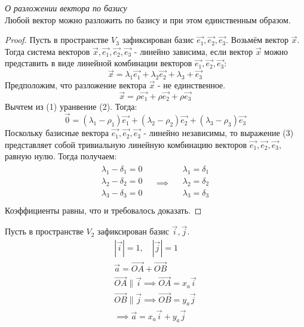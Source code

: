 \begin{theorem}
  \textit{О разложении вектора по базису} \\
  Любой вектор можно разложить по базису и при этом единственным образом.
\end{theorem}
\begin{proof}
  Пусть в пространстве $V_3$ зафиксирован базис $\vec{e_1}, \vec{e_2}, \vec{e_3}$. Возьмём вектор $\vec{x}$. Тогда система векторов $\vec{x}, \vec{e_1}, \vec{e_2}, \vec{e_3}$ - линейно зависима, если вектор $\vec{x}$ можно представить в виде линейной комбинации векторов $\vec{e_1}, \vec{e_2}, \vec{e_3}$: \[
  \vec{x} = \lambda_1 \vec{e_1} + \lambda_2 \vec{e_2} + \lambda_3 + \vec{e_3} \tag{1}
\]
  Предположим, что разложение вектора $\vec{x}$ - не единственное. \[
  \vec{x} = \rho \vec{e_1} + \rho \vec{e_2} + \rho \vec{e_3} \tag{2}
\]
  Вычтем из (1) уранвение (2). Тогда: \[
    \vec{0} = \left( \lambda_1 - \rho_1 \right) \vec{e_1} + \left( \lambda_2 - \rho_2 \right) \vec{e_2} + \left( \lambda_3 - \rho_3 \right) \vec{e_3} \tag{3}
\]
Поскольку базисные вектора $\vec{e_1}, \vec{e_2}, \vec{e_3}$ - линейно независимы, то выражение (3) представляет собой тривиальную линейную комбинацию векторов $\vec{e_1}, \vec{e_2}, \vec{e_3}$, равную нулю. Тогда получаем:
  \begin{gather*}
    \begin{matrix}  
      \lambda_1 - \delta_1 = 0 \\
      \lambda_2 - \delta_2 = 0 \\
      \lambda_3 - \delta_3 = 0 \\
    \end{matrix}
    \quad \implies \quad
    \begin{matrix}
      \lambda_1 = \delta_1 \\
      \lambda_2 = \delta_2 \\
      \lambda_3 = \delta_3 \\
    \end{matrix}
  \end{gather*}
  Коэффициенты равны, что и требовалось доказать.
\end{proof}
\begin{eg}
  Пусть в пространстве $V_2$ зафиксирован базис $\vec{i}, \vec{j}$.
  \begin{gather*}
    |\vec{i}| = 1, \quad |\vec{j}| = 1 \\
    \vec{a} = \overrightarrow{OA} + \overrightarrow{OB} \\
    \overrightarrow{OA} \parallel \vec{i} \implies \overrightarrow{OA} = x_a \vec{i} \\
    \overrightarrow{OB} \parallel \vec{j} \implies \overrightarrow{OB} = y_a \vec{j} \\
    \implies \vec{a} = x_a \vec{i} + y_a \vec{j}
  \end{gather*}
\end{eg}
